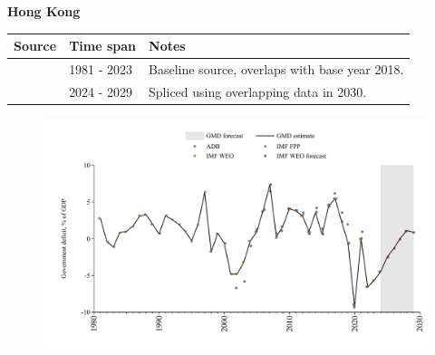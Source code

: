 \documentclass[12pt,a4paper,landscape]{article}
\begin{document}
\begin{adjustbox}{max totalsize={\paperwidth}{\paperheight},center}
\begin{minipage}[t][\textheight][t]{\textwidth}
\vspace*{0.5cm}
{}
\begin{center}
{\Large\bfseries Hong Kong}
\end{center}
\vspace{0.5cm}
\begin{table}[H]
\centering
\small
\begin{tabular}{|l|l|l|}
\hline
\textbf{Source} & \textbf{Time span} & \textbf{Notes} \\
\hline
\rowcolor{white}\cite{IMF_WEO}& 1981 - 2023 &Baseline source, overlaps with base year 2018.\\
\rowcolor{lightgray}\cite{IMF_WEO_forecast}& 2024 - 2029 &Spliced using overlapping data in 2030.\\
\hline
\end{tabular}
\end{table}
\begin{figure}[H]
\centering
\includegraphics[width=\textwidth,height=0.6\textheight,keepaspectratio]{graphs/HKG_govdef_GDP.pdf}
\end{figure}
\end{minipage}
\end{adjustbox}
\end{document}
